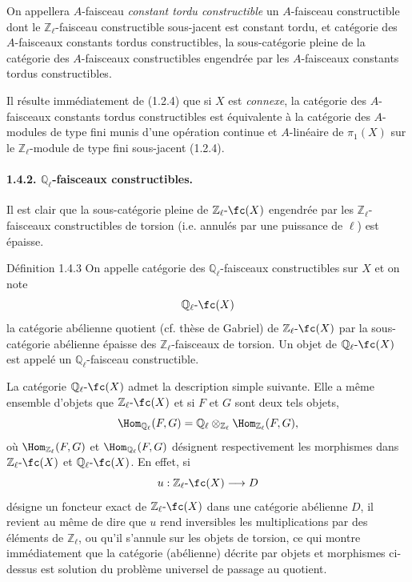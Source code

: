 On
appellera \(A\)-faisceau \emph{constant tordu constructible} un \(A\)-faisceau constructible dont le \(\mathbb{Z}_\ell\)-faisceau constructible sous-jacent est constant tordu, et catégorie des \(A\)-faisceaux constants tordus constructibles, la sous-catégorie pleine de la catégorie des \(A\)-faisceaux constructibles engendrée par les \(A\)-faisceaux constants tordus constructibles.

Il résulte immédiatement de (1.2.4) que si \(X\) est \emph{connexe}, la catégorie des \(A\)-faisceaux constants tordus constructibles est équivalente à la catégorie des \(A\)-modules de type fini munis d'une opération continue et \(A\)-linéaire de \(\pi_1(X)\) sur le \(\mathbb{Z}_\ell\)-module de type fini sous-jacent (1.2.4).

\paragraph{1.4.2. \(\mathbb{Q}_\ell\)-faisceaux constructibles.}
Il est clair que la sous-catégorie pleine de \(\mathbb{Z}_\ell\text{-}\fc(X)\) engendrée par les \(\mathbb{Z}_\ell\)-faisceaux constructibles de torsion (i.e. annulés par une puissance de \(\ell\)) est épaisse.

\begin{statement}{Définition 1.4.3}
On appelle catégorie des \(\mathbb{Q}_\ell\)-faisceaux constructibles sur \(X\) et on note
\[
\mathbb{Q}_\ell\text{-}\fc(X)
\]
la catégorie abélienne quotient (cf. thèse de Gabriel) de \(\mathbb{Z}_\ell\text{-}\fc(X)\) par la sous-catégorie abélienne épaisse des \(\mathbb{Z}_\ell\)-faisceaux de torsion. Un objet de \(\mathbb{Q}_\ell\text{-}\fc(X)\) est appelé un \(\mathbb{Q}_\ell\)-faisceau constructible.
\end{statement}

La catégorie \(\mathbb{Q}_\ell\text{-}\fc(X)\) admet la description simple suivante. Elle a même ensemble d'objets que \(\mathbb{Z}_\ell\text{-}\fc(X)\) et si \(F\) et \(G\) sont deux tels objets,
\[
\Hom_{\mathbb{Q}_\ell}(F,G)
=\mathbb{Q}_\ell\otimes_{\mathbb{Z}_\ell}\Hom_{\mathbb{Z}_\ell}(F,G),
\]
où \(\Hom_{\mathbb{Z}_\ell}(F,G)\) et \(\Hom_{\mathbb{Q}_\ell}(F,G)\)
désignent respectivement les morphismes dans \(\mathbb{Z}_\ell\text{-}\fc(X)\) et \(\mathbb{Q}_\ell\text{-}\fc(X)\). En effet, si
\[
u:\mathbb{Z}_\ell\text{-}\fc(X)\longrightarrow D
\]
désigne un foncteur exact de \(\mathbb{Z}_\ell\text{-}\fc(X)\) dans une catégorie abélienne \(D\), il revient au même de dire que \(u\) rend inversibles les multiplications par des éléments de \(\mathbb{Z}_\ell\), ou qu'il s'annule sur les objets de torsion, ce qui montre immédiatement que la catégorie (abélienne) décrite par objets et morphismes ci-dessus est solution du problème universel de passage au quotient.

